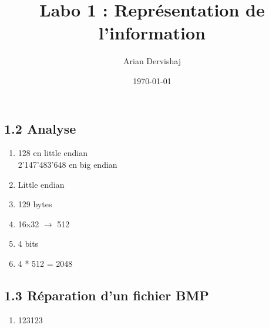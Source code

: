 \documentclass[a4paper, 12pt]{article}
\title{Labo 1 : Représentation de l'information}
\author{Arian Dervishaj}
\date{\today}
\begin{document}
\maketitle

\subsection*{1.2 Analyse}
\begin{enumerate}
    \item 128 en little endian\\ 
          2'147'483'648 en big endian
    \item Little endian
    \item 129 bytes
    \item 16x32 $\rightarrow$ 512
    \item 4 bits
    \item 4 * 512 = 2048

\end{enumerate}

\subsection*{1.3 Réparation d'un fichier BMP}
\begin{enumerate}
    \item 123123

\end{enumerate}
\end{document}
